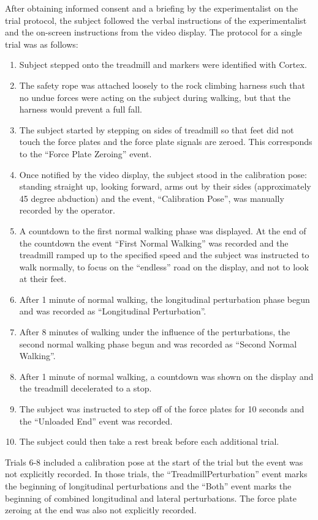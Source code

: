\documentclass[fleqn,12pt]{wlpeerj}
\begin{document}
After obtaining informed consent and a briefing by the experimentalist on the
trial protocol, the subject followed the verbal instructions of the
experimentalist and the on-screen instructions from the video display. The
protocol for a single trial was as follows:
%
\begin{enumerate}
  \item Subject stepped onto the treadmill and markers were identified with
    Cortex.
  \item The safety rope was attached loosely to the rock climbing harness such
    that no undue forces were acting on the subject during walking, but that
    the harness would prevent a full fall.
  \item The subject started by stepping on sides of treadmill so that feet did
    not touch the force plates and the force plate signals are zeroed. This
    corresponds to the ``Force Plate Zeroing'' event.
  \item Once notified by the video display, the subject stood in the
    calibration pose: standing straight up, looking forward, arms out by their
    sides (approximately 45 degree abduction) and the event, ``Calibration
    Pose'', was manually recorded by the operator.
  \item A countdown to the first normal walking phase was displayed. At the end
    of the countdown the event ``First Normal Walking'' was recorded and the
    treadmill ramped up to the specified speed and the subject was instructed
    to walk normally, to focus on the ``endless'' road on the display, and not
    to look at their feet.
  \item After 1 minute of normal walking, the longitudinal perturbation phase
    begun and was recorded as ``Longitudinal Perturbation''.
  \item After 8 minutes of walking under the influence of the perturbations,
    the second normal walking phase begun and was recorded as ``Second Normal
    Walking''.
  \item After 1 minute of normal walking, a countdown was shown on the display
    and the treadmill decelerated to a stop.
  \item The subject was instructed to step off of the force plates for 10
    seconds and the ``Unloaded End'' event was recorded.
  \item The subject could then take a rest break before each additional trial.
\end{enumerate}

Trials 6-8 included a calibration pose at the start of the trial but the event
was not explicitly recorded. In those trials, the ``TreadmillPerturbation''
event marks the beginning of longitudinal perturbations and the ``Both'' event
marks the beginning of combined longitudinal and lateral perturbations. The
force plate zeroing at the end was also not explicitly recorded.
\end{document}
